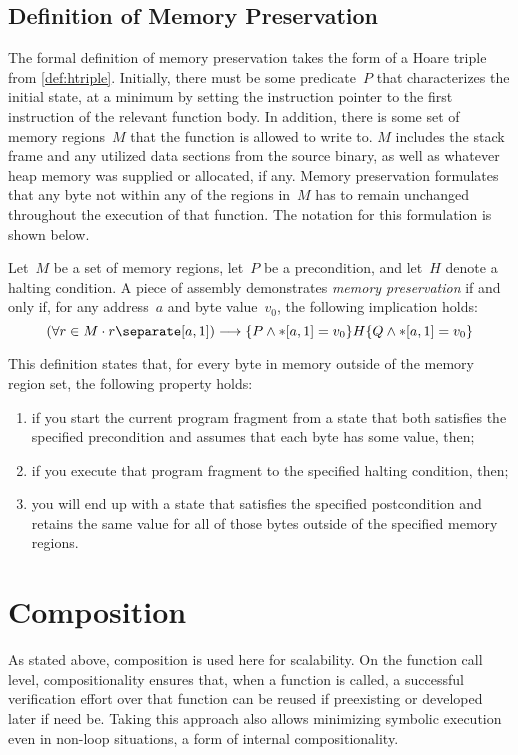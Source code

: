 \subsection{Definition of Memory Preservation}\label{sse:mem_pres}
The formal definition of memory preservation%
takes the form of a Hoare triple from \cref{def:htriple}.
Initially, there must be some predicate~$P$ that characterizes the initial state,
at a minimum by setting the instruction pointer
to the first instruction of the relevant function body.
In addition, there is some set of memory regions~$M$
that the function is allowed to write to.
$M$ includes the stack frame and any utilized data sections from the source binary,
as well as whatever heap memory was supplied or allocated, if any.
Memory preservation formulates that any byte not within any of the regions in~$M$
has to remain unchanged throughout the execution of that function.
The notation for this formulation is shown below.
\begin{definition}\label{mem_pres_hoare}
  Let~$M$ be a set of memory regions, let~$P$ be a precondition,
  and let~$H$ denote a halting condition.
  A piece of assembly demonstrates \emph{memory preservation} if and only if,
  for any address~$a$ and byte value~$v_0$, the following implication holds:
  \begin{equation}
  (\forall r\in M\cdot r\separate\region{a}1)\longrightarrow\htriple{P\wedge \readmem{a}1=v_0}H{Q\wedge\readmem{a}1=v_0}
  \end{equation}
\end{definition}
This definition states that, for every byte in memory outside of the memory region set,
the following property holds:
\begin{enumerate}
  \item if you start the current program fragment from a state that both satisfies
  the specified precondition and assumes that each byte has some value, then;
  \item if you execute that program fragment to the specified halting condition, then;
  \item you will end up with a state that satisfies the specified postcondition
  and retains the same value for all of those bytes outside of the specified memory regions.
\end{enumerate}

\section{Composition}\label{se:cfg_composition}
As stated above, composition is used here for scalability.%
On the function call level, compositionality ensures that,
when a function is called,
a successful verification effort over that function can be reused
if preexisting or developed later if need be.
Taking this approach also allows minimizing symbolic execution
even in non-loop situations, a form of internal compositionality.

